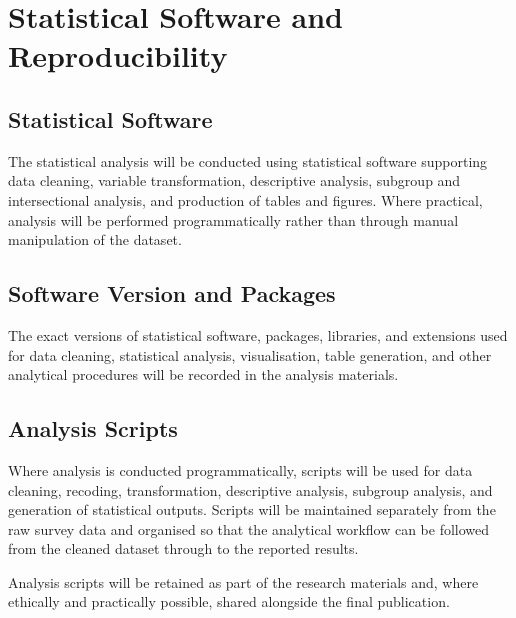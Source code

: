 \section{Statistical Software and Reproducibility}

\subsection{Statistical Software}

The statistical analysis will be conducted using statistical software supporting data cleaning, variable transformation, descriptive analysis, subgroup and intersectional analysis, and production of tables and figures. Where practical, analysis will be performed programmatically rather than through manual manipulation of the dataset.


\subsection{Software Version and Packages}

The exact versions of statistical software, packages, libraries, and extensions used for data cleaning, statistical analysis, visualisation, table generation, and other analytical procedures will be recorded in the analysis materials.


\subsection{Analysis Scripts}

Where analysis is conducted programmatically, scripts will be used for data cleaning, recoding, transformation, descriptive analysis, subgroup analysis, and generation of statistical outputs. Scripts will be maintained separately from the raw survey data and organised so that the analytical workflow can be followed from the cleaned dataset through to the reported results.

Analysis scripts will be retained as part of the research materials and, where ethically and practically possible, shared alongside the final publication.


